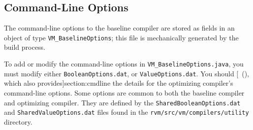 \subsection{Command-Line Options}%

The command-line options to the baseline compiler are
stored as fields in an object of type {\tt VM\_BaselineOptions}; this
file is mechanically generated by the build process. 

To add or modify the command-line options in {\tt VM\_BaselineOptions.java},
you must modify either {\tt BooleanOptions.dat}, or {\tt ValueOptions.dat}.
You should [~(\Ref), which also
  provides]{section:cmdline} the
details for the optimizing compiler's command-line options.
Some options are common to both the baseline compiler and optimizing
compiler. They are defined by the {\tt SharedBooleanOptions.dat} and
{\tt SharedValueOptions.dat} files found in the
{\tt rvm/\-src/\-vm/\-com\-pi\-lers/\-u\-til\-i\-ty} directory. 
